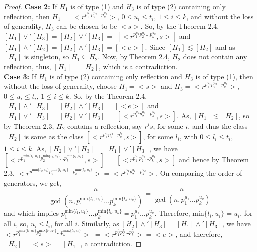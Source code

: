 \documentclass{article}
\theoremstyle{definition}
\begin{document}
\begin{proof}
\textbf{Case 2:} If $H_1$ is of type (1) and $H_3$ is of type (2) containing only reflection, then $H_1=$ $ \bigl<r^{p_1^{u_1}p_2^{u_2}\dots p_k^{u_k}}\bigr>$, $0\le u_i\le t_i$, $1\le i\le k$, and without the loss of generality, $H_3$ can be chosen to be $\bigl<s\bigr>$. So, by the Theorem 2.4, $[H_1]\vee' [H_3]=[H_2]\vee' [H_3]=$ $ [\bigl<r^{p_1^{u_1}p_2^{u_2}\dots p_k^{u_k}},s\bigr>]$ and $[H_1]\wedge' [H_2]=[H_2]\wedge'[H_3]=[\bigl<e\bigr>]$. Since $[H_1]\lesssim [H_2]$ and as $[H_1]$ is singleton, so $H_1\subseteq H_2$. Now, by Theorem 2.4, $H_2$ does not contain any reflection, thus, $[H_1]=[H_2]$, which is a contradiction. \vspace{0.2cm}\\
\textbf{Case 3:} If $H_1$ is of type (2) containing only reflection and $H_3$ is of type (1), then without the loss of generality, choose $H_1=\bigl<s\bigr>$ and $H_3=\bigl<r^{p_1^{u_1}p_2^{u_2}\dots p_k^{u_k}}\bigr>$, $0\le u_i\le t_i$, $1\le i\le k$. So, by the Theorem 2.4, $[H_1]\wedge' [H_3]=[H_2]\wedge' [H_3]=[\bigl<e\bigr>]$ and $[H_1]\vee'[H_3]=[H_2]\vee'[H_3]=$ $[\bigl<r^{p_1^{u_1}p_2^{u_2}\dots p_k^{u_k}},s\bigr>] $. As, $[H_1]\lesssim [H_2]$, so by Theorem 2.3, $H_2$ contains a reflection, say $r^is$, for some $i$, and thus the class $[H_2]$ is same as the class $[\bigl<r^{p_1^{l_1}p_2^{l_2}\dots p_k^{l_k}},s\bigr>]$, for some $l_i$, with $0\le l_i \le t_i$, $1\le i\le k$. As, $[H_2]\vee'[H_3]=[H_1]\vee'[H_3]$, we have $[\bigl<r^{p_1^{\text{min}\{l_1,u_1\}}p_2^{\text{min}\{l_2,u_2\}}\dots p_k^{\text{min}\{l_k,u_k\}}},s\bigr>]= $ $  [\bigl<r^{p_1^{u_1}p_2^{u_2}\dots p_k^{u_k}},s\bigr>] $ and hence by Theorem 2.3, $\bigl<r^{p_1^{\text{min}\{l_1,u_1\}}p_2^{\text{min}\{l_2,u_2\}}\dots p_k^{\text{min}\{l_k,u_k\}}}\bigr>=
\bigl<r^{p_1^{u_1}p_2^{u_2}\dots p_k^{u_k}}\bigr>$. On comparing the order of generators, we get,
\begin{equation*}
\frac{n}{\gcd(n, p_1^{\text{min}\{l_1,u_1\}}\dots p_k^{\text{min}\{l_k,u_k\}}   )}=\frac{n}{\gcd(n, p_1^{u_1}\dots p_k^{u_k})}
\end{equation*}
and which implies $p_1^{\text{min}\{l_1,u_1\}}\dots p_k^{\text{min}\{l_k,u_k\}}=p_1^{u_1}\dots p_k^{u_k}$. Therefore, $\text{min}\{l_i,u_i\}=u_i$, for all $i$, so, $u_i\le l_i$, for all $i$. Similarly, as $[H_2]\wedge'[H_3]=[H_1]\wedge'[H_3]$, we have $\bigl<r^{p_1^{\text{max}\{l_1,u_1\}}p_2^{\text{max}\{l_2,u_2\}}\dots p_k^{\text{max}\{l_k,u_k\}}}\bigr> $ $=\bigl<r^{p_1^{l_1}p_2^{l_2}\dots p_k^{l_k}}\bigr>=\bigl<e\bigr>$, and therefore, $[H_2]=\bigl<s\bigr>=[H_1]$, a contradiction.

\end{proof}
\end{document}
